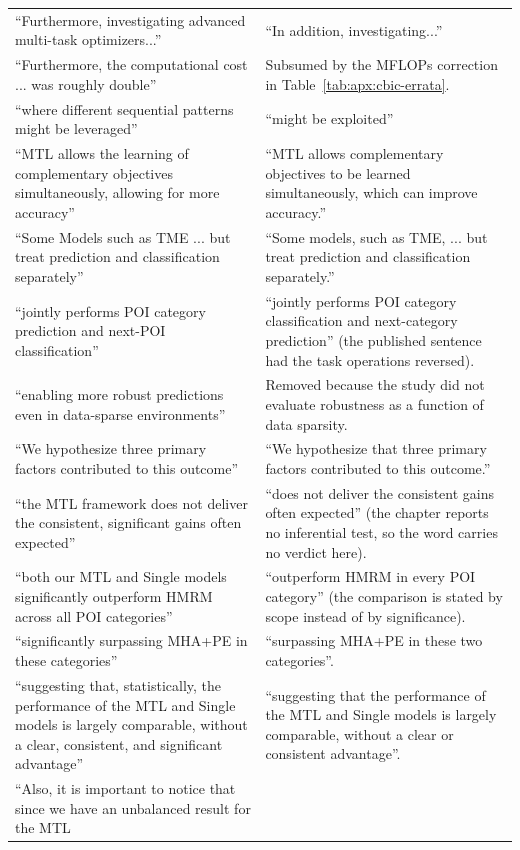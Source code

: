 {\begin{longtable}{@{}p{}p{}@{}}
``Furthermore, investigating advanced multi-task optimizers...'' &
``In addition, investigating...'' \\
``Furthermore, the computational cost ... was roughly double'' &
Subsumed by the MFLOPs correction in Table~\ref{tab:apx:cbic-errata}. \\
``where different sequential patterns might be leveraged'' &
``might be exploited'' \\
``MTL allows the learning of complementary objectives simultaneously, allowing for
more accuracy'' &
``MTL allows complementary objectives to be learned simultaneously, which can improve
accuracy.'' \\
``Some Models such as TME ... but treat prediction and classification separately'' &
``Some models, such as TME, ... but treat prediction and classification separately.'' \\
``jointly performs POI category prediction and next-POI classification'' &
``jointly performs POI category classification and next-category prediction'' (the
published sentence had the task operations reversed). \\
``enabling more robust predictions even in data-sparse environments'' &
Removed because the study did not evaluate robustness as a function of data sparsity. \\
``We hypothesize three primary factors contributed to this outcome'' &
``We hypothesize that three primary factors contributed to this outcome.'' \\
\addlinespace
``the MTL framework does not deliver the consistent, significant gains often
expected'' &
``does not deliver the consistent gains often expected'' (the chapter reports no
inferential test, so the word carries no verdict here). \\
``both our MTL and Single models significantly outperform HMRM across all POI
categories'' &
``outperform HMRM in every POI category'' (the comparison is stated by scope instead of
by significance). \\
``significantly surpassing MHA+PE in these categories'' &
``surpassing MHA+PE in these two categories''. \\
``suggesting that, statistically, the performance of the MTL and Single models is
largely comparable, without a clear, consistent, and significant advantage'' &
``suggesting that the performance of the MTL and Single models is largely comparable,
without a clear or consistent advantage''. \\
\addlinespace
``Also, it is important to notice that since we have an unbalanced result for the MTL

\end{longtable}}
